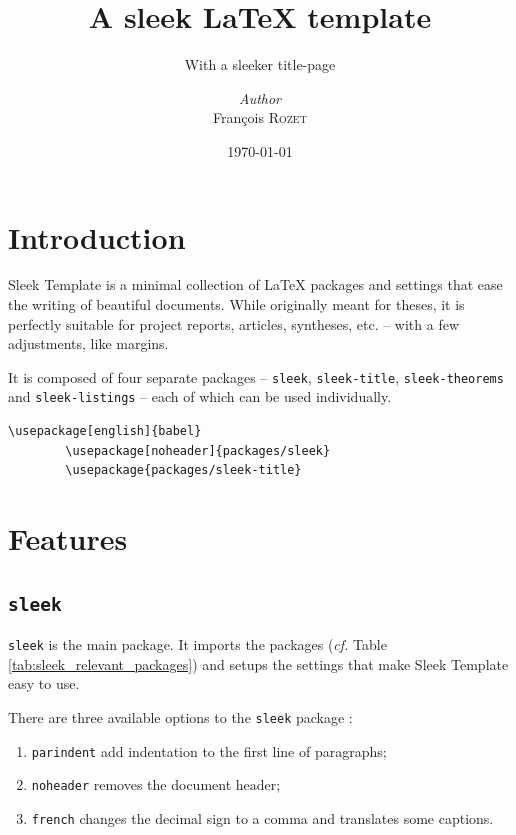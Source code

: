 \documentclass[a4paper, 12pt]{report}
\institute{Random University}
\title{A sleek \LaTeX{} template}
\subtitle{With a sleeker title-page}
\author{\textit{Author}\\François \textsc{Rozet}}
\date{\today}
\begin{document}
    \maketitle
    \romantableofcontents

    \chapter{Introduction}

    Sleek Template is a minimal collection of \LaTeX{} packages and settings that ease the writing of beautiful documents. While originally meant for theses, it is perfectly suitable for project reports, articles, syntheses, etc. -- with a few adjustments, like margins.

    It is composed of four separate packages -- \texttt{sleek}, \texttt{sleek-title}, \texttt{sleek-theorems} and \texttt{sleek-listings} -- each of which can be used individually.

    \begin{lstlisting}[style=latexFrameTB, caption={Example of Sleek Template packages usage.}, gobble=8]
        \usepackage[english]{babel}
        \usepackage[noheader]{packages/sleek}
        \usepackage{packages/sleek-title}
    \end{lstlisting}


    \chapter{Features}

    \section{\texttt{sleek}}

    \texttt{sleek} is the main package. It imports the packages (\emph{cf.} Table \ref{tab:sleek_relevant_packages}) and setups the settings that make Sleek Template easy to use.

    There are three available options to the \texttt{sleek} package :

    \begin{enumerate}[noitemsep]
        \item \texttt{parindent} add indentation to the first line of paragraphs;
        \item \texttt{noheader} removes the document header;
        \item \texttt{french} changes the decimal sign to a comma and translates some captions.
    \end{enumerate}
\end{document}
